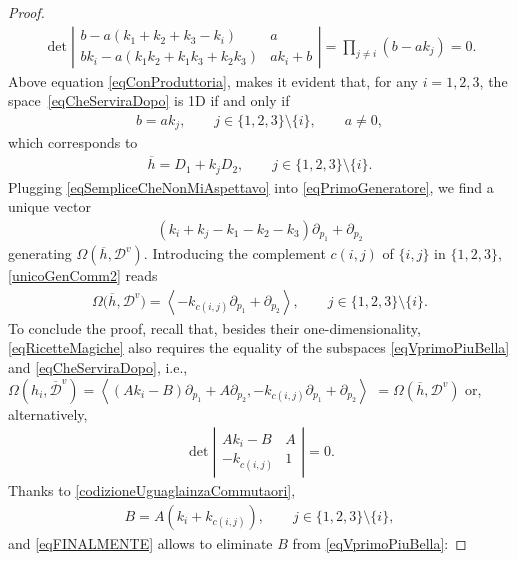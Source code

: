 \documentclass[10pt,a4paper]{amsart}
\newcommand{\D}{\mathcal{D}}
\newcommand{\Span}[1]{\left\langle #1 \right\rangle}
\numberwithin{equation}{section}
\begin{document}
\begin{proof}
\begin{gather}
\det \left|\begin{matrix}b-a(k_1+k_2+k_3-k_i) & a \\bk_i-a(k_1k_2+k_1k_3+k_2k_3) & ak_i+b\end{matrix}\right|=\prod_{j\neq i} (b-ak_j)=0.
\end{gather}
Above equation \eqref{eqConProduttoria}, makes it evident that, for any $i=1,2,3$, the space~\eqref{eqCheServiraDopo} is 1D if and only if
\begin{gather}\label{eqSempliceCheNonMiAspettavo}
b=ak_j,\qquad j\in\{1,2,3\}{\setminus}\{i\}, \qquad a\neq 0,
\end{gather}
which corresponds to
\begin{gather}\label{eqAccPrimo}
\overline{h}=D_1 +k_jD_2 ,\qquad j\in\{1,2,3\}{\setminus}\{i\}.
\end{gather}
Plugging \eqref{eqSempliceCheNonMiAspettavo} into \eqref{eqPrimoGeneratore}, we f\/ind a unique vector
\begin{gather}\label{unicoGenComm2}
(k_i+k_j-k_1-k_2-k_3) \partial_{p_{1}} + \partial_{p_{2}}
\end{gather}
generating $ \Omega(\overline{h}, {\D}^v) $. Introducing the complement $c(i,j)$ of $\{i,j\}$ in $\{1,2,3\}$, \eqref{unicoGenComm2} reads
\begin{gather*}%
 \Omega\big(\overline{h}, {\D}^v\big) = \Span{-k_{c(i,j)}\partial_{p_{1}} + \partial_{p_{2}} },\qquad j\in\{1,2,3\}{\setminus}\{i\}.
\end{gather*}
To conclude the proof, recall that, besides their one-dimensionality, \eqref{eqRicetteMagiche} also requires the equa\-li\-ty of the subspaces \eqref{eqVprimoPiuBella} and \eqref{eqCheServiraDopo}, i.e.,
$ \Omega(h_i,\overline{\D}^v)=\Span{( Ak_i-B)\partial_{p_{1}}+A\partial_{p_{2}} , -k_{c(i,j)}\partial_{p_{1}} + \partial_{p_{2}} }$ $= \Omega(\overline{h}, {\D}^v)$
or, alternatively,
 \begin{gather}\label{codizioneUguaglainzaCommutaori}
\det\left|\begin{matrix} Ak_i-B & A \\ -k_{c(i,j)} & 1 \end{matrix}\right| =0.
\end{gather}
Thanks to \eqref{codizioneUguaglainzaCommutaori},
 \begin{gather}\label{eqFINALMENTE}
B=A(k_i+k_{c(i,j)}),\qquad j\in\{1,2,3\}{\setminus}\{i\},
\end{gather}
and \eqref{eqFINALMENTE} allows to eliminate $B$ from \eqref{eqVprimoPiuBella}:

\end{proof}
\end{document}
